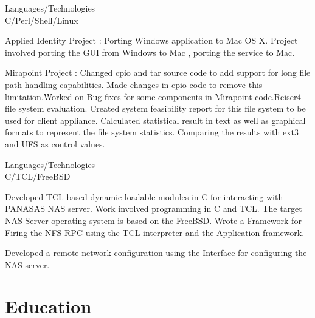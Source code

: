 \documentclass[a4,10pt]{cv4tw}
\begin{document}
{Languages/Technologies \\ C/Perl/Shell/Linux}
	{
	\begin{missions}
		\item Applied Identity Project : Porting Windows application to Mac OS X. Project involved porting the GUI from Windows to Mac , porting the service to Mac.
		\item Mirapoint Project : Changed cpio and tar source code to add support for long file path handling capabilities. Made changes in cpio code to remove this limitation.Worked on Bug fixes for some components in Mirapoint code.Reiser4 file system evaluation. Created system feasibility report for this file system to be used for client appliance. Calculated statistical result in text as well as graphical formats to represent the file system statistics. Comparing the results with ext3 and UFS as control values.
	\end{missions}
}

{Languages/Technologies \\ C/TCL/FreeBSD}
	{
	\begin{missions}
		\item Developed TCL based dynamic loadable modules in C for interacting with PANASAS NAS server. Work involved programming in C and TCL. The target NAS Server operating system is based on the FreeBSD. Wrote a Framework for Firing the NFS RPC using the TCL interpreter and the Application framework.
		\item Developed a remote network configuration using the  Interface for configuring the NAS server.
	\end{missions}
}


\section{Education}

\end{document}
